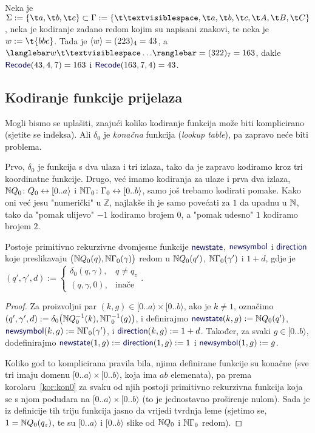 \begin{primjer}
Neka je $\Sigma:=\{\t a,\t b,\t c\}\subset\Gamma:=\{\bl,\t a,\t b,\t c,\t A,\t B,\t C\}$, neka je kodiranje zadano redom kojim su napisani znakovi, te neka je $w:=\t{bbc}$. Tada je $\langle w\rangle=(223)_4=43$, a $\knk{w\bl\ldots}=(322)_7=163$, dakle $\f{Recode}(43,4,7)=163$ i $\f{Recode}(163,7,4)=43$.
\end{primjer}

\subsection{Kodiranje funkcije prijelaza}

Mogli bismo se uplašiti, znajući koliko kodiranje funkcija može biti komplicirano (sjetite se indeksa). Ali $\delta_0$ je \emph{konačna} funkcija (\emph{lookup table}), pa zapravo neće biti problema.

Prvo, $\delta_0$ je funkcija s dva ulaza i tri izlaza, tako da je zapravo kodiramo kroz tri koordinatne funkcije. Drugo, već imamo kodiranja za ulaze i prva dva izlaza, ${\mathbb N} Q_0\colon Q_0\leftrightarrow[0..a\rangle$ i ${\mathbb N}\Gamma_0\colon\Gamma_0\leftrightarrow[0..b\rangle$, samo još trebamo kodirati pomake. Kako oni već jesu "numerički" u $\mathbb Z$, najlakše ih je samo povećati za $1$ da upadnu u ${\mathbb N}$, tako da "pomak ulijevo" $-1$ kodiramo brojem $0$, a "pomak udesno" $1$ kodiramo brojem $2$.

\begin{lema}\label{lm:newssdprn}
Postoje primitivno rekurzivne dvomjesne funkcije $\f{newstate}$, $\f{newsymbol}$ i $\f{direction}$ koje preslikavaju $\bigl({\mathbb N} Q_0(q),{\mathbb N}\Gamma_0(\gamma)\bigr)$ redom u ${\mathbb N} Q_0(q')$, ${\mathbb N}\Gamma_0(\gamma')$ i $1+d$, gdje je 
$(q',\gamma',d):=\begin{cases}
\delta_0(q,\gamma),& q\not=q_z\\
(q,\gamma,0),&\text{inače}\end{cases}$.
\end{lema}
\begin{proof}
Za proizvoljni par $(k,g)\in[0..a\rangle\times[0..b\rangle$, ako je $k\not=1$, označimo $(q',\gamma',d):=\delta_0\bigl({\mathbb N} Q_0^{-1}(k),{\mathbb N}\Gamma_0^{-1}(g)\bigr)$, i definirajmo $\f{newstate}(k,g):=\N Q_0(q')$, $\f{newsymbol}(k,g):=\N\Gamma_0(\gamma')$, i $\f{direction}(k,g):=1+d$. Također, za svaki $g\in[0..b\rangle$, dodefinirajmo $\f{newstate}(1,g):=\f{direction}(1,g):=1$ i $\f{newsymbol}(1,g):=g$.

Koliko god to komplicirana pravila bila, njima definirane funkcije su konačne (sve tri imaju domenu $[0..a\rangle\times[0..b\rangle$, koja ima $ab$ elemenata), pa prema korolaru~\ref{kor:kon0} za svaku od njih postoji primitivno rekurzivna funkcija koja se s njom podudara na $[0..a\rangle\times[0..b\rangle$ (to je jednostavno proširenje nulom). Sada je iz definicije tih triju funkcija jasno da vrijedi tvrdnja leme (sjetimo se, $1={\mathbb N} Q_0(q_z)$, te su $[0..a\rangle$ i $[0..b\rangle$ slike od ${\mathbb N} Q_0$ i ${\mathbb N}\Gamma_0$ redom).
\end{proof}

